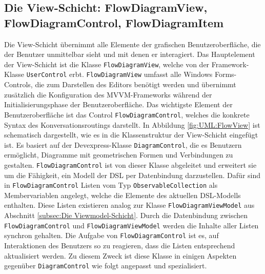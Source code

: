 \subsection[Die View-Schicht]{Die View-Schicht: FlowDiagramView, FlowDiagramControl, FlowDiagramItem}
Die View-Schicht übernimmt alle Elemente der grafischen Benutzeroberfläche, die der Benutzer unmittelbar sieht und mit denen er interagiert. Das Hauptelement der View-Schicht ist die Klasse \texttt{FlowDiagramView}, welche von der Framework-Klasse \texttt{UserControl} erbt. \texttt{FlowDiagramView} umfasst alle Windows Forms-Controls, die zum Darstellen des Editors benötigt werden und übernimmt zusätzlich die Konfiguration des MVVM-Frameworks während der Initialisierungsphase der Benutzeroberfläche.
\newline  
Das wichtigste Element der Benutzeroberfläche ist das Control \texttt{FlowDiagramControl}, welches  die konkrete Syntax des Konversationsroutings darstellt. In Abbildung \ref{fig:UML:FlowView} ist schematisch dargestellt, wie es in die Klassenstruktur der View-Schicht eingefügt ist. Es basiert auf der Devexpress-Klasse \texttt{DiagramControl}, die es Benutzern ermöglicht, Diagramme mit geometrischen Formen und Verbindungen zu gestalten. \texttt{FlowDiagramControl} ist von dieser Klasse abgeleitet und erweitert sie um die Fähigkeit, ein Modell der DSL per Datenbindung darzustellen. Dafür sind in \texttt{FlowDiagramControl} Listen vom Typ \texttt{ObservableCollection} als Membervariablen angelegt, welche die Elemente des aktuellen DSL-Modells enthalten. Diese Listen existieren analog zur Klasse \texttt{FlowDiagramViewModel} aus Abschnitt \ref{subsec:Die Viewmodel-Schicht}. Durch die Datenbindung zwischen \texttt{FlowDiagramControl} und \texttt{FlowDiagramViewModel} werden die Inhalte aller Listen synchron gehalten. Die Aufgabe von \texttt{FlowDiagramControl} ist es, auf Interaktionen des Benutzers so zu reagieren, dass die Listen entsprechend aktualisiert werden. Zu diesem Zweck ist diese Klasse in einigen Aspekten gegenüber \texttt{DiagramControl} wie folgt angepasst und spezialisiert.
\newline
